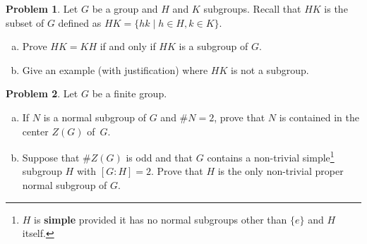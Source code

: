\documentclass[11pt]{article}
\theoremstyle{definition}
\newtheorem{problem}{Problem}
\begin{document}
\begin{problem} Let $G$ be a group and $H$ and $K$ subgroups. Recall that $HK$ is the subset of $G$ defined as ${HK = \{hk \mid h \in H,k \in K\}}$.
\begin{enumerate}[(a)]
\item  Prove $HK=KH$ if and only if $HK$ is a subgroup of $G$.
\item Give an example (with justification) where $HK$ is not a subgroup.
\end{enumerate}
\end{problem}


\begin{problem} Let $G$ be a finite group.
\begin{enumerate}[(a)]
\item If $N$ is a normal subgroup of $G$ and $\#N = 2$, prove that $N$ is contained in the center $Z(G)$ of~$G$.
\item Suppose that $\# Z(G)$ is odd and that $G$ contains a non-trivial simple\footnote{$H$ is \textbf{simple} provided it has no normal subgroups
  other than $\{e\}$ and $H$ itself.} subgroup $H$ with ${[G : H] = 2}$. Prove that $H$ is the only non-trivial proper normal subgroup of $G$. 
\end{enumerate}
\end{problem}
\end{document}
